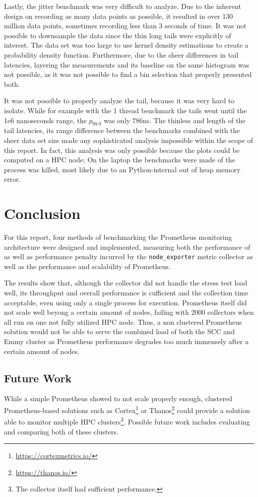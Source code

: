 Lastly, the jitter benchmark was very difficult to analyze. Due to the inherent design on recording as many data points as possible, it resulted in over 130 million data points, sometimes recording less than 3 seconds of time. It was not possible to downsample the data since the thin long tails were explicitly of interest. The data set was too large to use kernel density estimations to create a probability density function. Furthermore, due to the sheer differences in tail latencies, layering the measurements and its baseline on the same histogram was not possible, as it was not possible to find a bin selection that properly presented both.

It was not possible to properly analyze the tail, because it was very hard to isolate. While for example with the 1 thread benchmark the tails went until the 1e6 nanoseconds range, the $p_{99.9}$ was only $786$ns. The thinless and length of the tail latencies, its range difference between the benchmarks combined with the sheer data set size made any sophisticated analysis impossible within the scope of this report. In fact, this analysis was only possible because the plots could be computed on a \ac{HPC} node; On the laptop the benchmarks were made of the process was killed, most likely due to an Python-internal out of heap memory error.

\section{Conclusion}
For this report, four methods of benchmarking the Prometheus monitoring architecture were designed and implemented, measuring both the performance of as well as performance penalty incurred by the \texttt{node\_exporter} metric collector as well as the performance and scalability of Prometheus.

The results show that, although the collector did not handle the stress test load well, its throughput and overall performance is cufficient and the collection time acceptable, even using only a single process for execution. Prometheus itself did not scale well beyong a certain amount of nodes, failing with 2000 collectors when all run on one not fully utilized \ac{HPC} node. Thus, a non clustered Prometheus solution would not be able to serve the combined load of both the SCC and Emmy cluster as Prometheus performance degrades too much immensely after a certain amount of nodes.

\subsection{Future Work}
While a simple Prometheus showed to not scale properly enough, clustered Prometheus-based solutions such as Cortex\footnote{\url{https://cortexmetrics.io/}} or Thanos\footnote{\url{https://thanos.io/}} could provide a solution able to monitor multiple \ac{HPC} clusters\footnote{The collector itself had sufficient performance.}. Possible future work includes evaluating and comparing both of these clusters.

